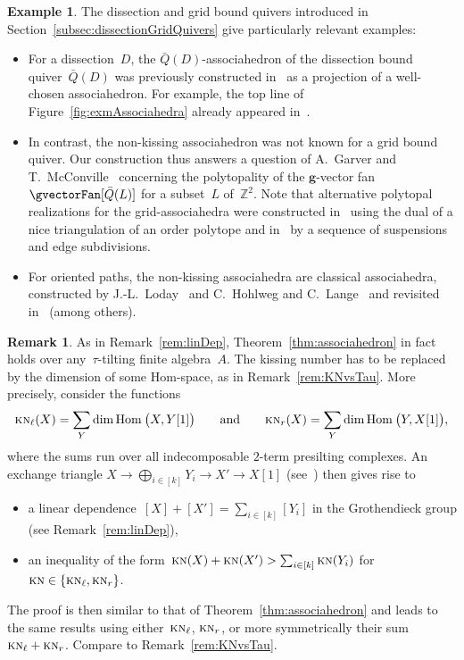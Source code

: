 \documentclass{amsart}
\theoremstyle{definition}
\newtheorem{example}[theorem]{Example}
\newtheorem{remark}[theorem]{Remark}
\newcommand{\Z}{\mathbb{Z}} %
\renewcommand{\b}[1]{\mathbf{#1}} %
\newcommand{\fref}[1]{Figure~\ref{#1}} %
\newcommand{\KN}{\textsc{kn}} %
\newcommand{\Hom}[1]{\operatorname{{\rm Hom}}_{#1}}
\begin{document}
\begin{example}
The dissection and grid bound quivers introduced in Section~\ref{subsec:dissectionGridQuivers} give particularly relevant examples:
\begin{itemize}
\item For a dissection~$D$, the $\bar Q(D)$-associahedron of the dissection bound quiver~$\bar Q(D)$ was previously constructed in~\cite{MannevillePilaud-accordion} as a projection of a well-chosen associahedron.
For example, the top line of \fref{fig:exmAssociahedra} already appeared in~\cite{MannevillePilaud-accordion}.
\item In contrast, the non-kissing associahedron was not known for a grid bound quiver. Our construction thus answers a question of A.~Garver and T.~McConville~\cite{GarverMcConville-grid} concerning the polytopality of the $\b{g}$-vector fan~$\gvectorFan[\bar Q(L)]$ for a subset~$L$ of~$\Z^2$. Note that alternative polytopal realizations for the grid-associahedra were constructed in~\cite{SantosStumpWelker} using the dual of a nice triangulation of an order polytope and in~\cite[Sect.~4]{McConville} by a sequence of suspensions and edge subdivisions.
\item For oriented paths, the non-kissing associahedra are classical associahedra, constructed by J.-L.~Loday~\cite{Loday} and C.~Hohlweg and C.~Lange~\cite{HohlwegLange} and revisited in~\cite{HohlwegLangeThomas, Stella, PilaudSantos-brickPolytope, LangePilaud, HohlwegPilaudStella} (among others).
\end{itemize}
\end{example}

\begin{remark}
\label{rem:polytope}
As in Remark~\ref{rem:linDep}, Theorem~\ref{thm:associahedron} in fact holds over any~$\tau$-tilting finite algebra~$A$.
The kissing number has to be replaced by the dimension of some Hom-space, as in Remark~\ref{rem:KNvsTau}.
More precisely, consider the functions
\[
\KN_\ell(X) = \sum_Y \dim \Hom{} \big( X, Y[1] \big)
\qquad\text{and}\qquad
\KN_r(X) = \sum_Y \dim \Hom{} \big( Y, X[1] \big),
\]
where the sums run over all indecomposable $2$-term presilting complexes.
An exchange triangle $X \rightarrow \bigoplus_{i \in [k]} Y_i \rightarrow X' \rightarrow X[1]$ (see~\cite{AiharaIyama}) then gives rise to
\begin{itemize}
\item a linear dependence~$[X] + [X'] = \sum_{i \in [k]} [Y_i]$ in the Grothendieck group (see Remark~\ref{rem:linDep}),
\item an inequality of the form~$\KN(X) + \KN(X') > \sum_{i \in [k]} \KN(Y_i)$ for~$\KN \in \{\KN_\ell, \KN_r\}$.
\end{itemize}
The proof is then similar to that of Theorem~\ref{thm:associahedron} and leads to the same results using either~$\KN_\ell$, $\KN_r$, or more symmetrically their sum~$\KN_\ell + \KN_r$.
Compare to Remark~\ref{rem:KNvsTau}.
\end{remark}
\end{document}
